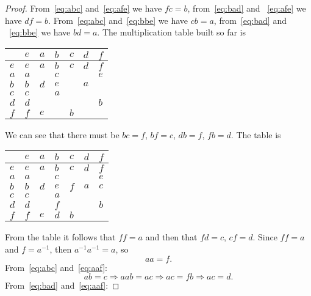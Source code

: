 \begin{proof}
  From~\eqref{eq:abc} and~\eqref{eq:afe} we have $fc = b$,
  from~\eqref{eq:bad} and ~\eqref{eq:afe} we have $df = b$.
  From~\eqref{eq:abc} and~\eqref{eq:bbe} we have $cb = a$,
  from~\eqref{eq:bad} and ~\eqref{eq:bbe} we have $bd = a$. The
  multiplication table built so far is
  \begin{center}
  \begin{tabular}{l|llllll}
        & $e$ & $a$ & $b$ & $c$ & $d$ & $f$ \\ \hline
    $e$ & $e$ & $a$ & $b$ & $c$ & $d$ & $f$ \\
    $a$ & $a$ & $ $ & $c$ & $ $ & $ $ & $e$ \\
    $b$ & $b$ & $d$ & $e$ & $ $ & $a$ & $ $ \\
    $c$ & $c$ & $ $ & $a$ & $ $ & $ $ & $ $ \\
    $d$ & $d$ & $ $ & $ $ & $ $ & $ $ & $b$ \\
    $f$ & $f$ & $e$ & $ $ & $b$ & $ $ & $ $ \\
  \end{tabular}
  \end{center}
  We can see that there must be $bc = f$, $bf = c$, $db = f$, $fb =
  d$. The table is
  \begin{center}
  \begin{tabular}{l|llllll}
        & $e$ & $a$ & $b$ & $c$ & $d$ & $f$ \\ \hline
    $e$ & $e$ & $a$ & $b$ & $c$ & $d$ & $f$ \\
    $a$ & $a$ & $ $ & $c$ & $ $ & $ $ & $e$ \\
    $b$ & $b$ & $d$ & $e$ & $f$ & $a$ & $c$ \\
    $c$ & $c$ & $ $ & $a$ & $ $ & $ $ & $ $ \\
    $d$ & $d$ & $ $ & $f$ & $ $ & $ $ & $b$ \\
    $f$ & $f$ & $e$ & $d$ & $b$ & $ $ & $ $ \\
  \end{tabular}
  \end{center}
  From the table it follows that $ff = a$ and then that $fd = c$, $cf
  = d$. Since $ff = a$ and $f = a^{-1}$, then $a^{-1}a^{-1} = a$, so
  \begin{equation}
    aa = f. \label{eq:aaf}
  \end{equation}
  From~\eqref{eq:abc} and~\eqref{eq:aaf}:
  \begin{equation} \nonumber
    ab = c \Rightarrow aab = ac \Rightarrow ac = fb \Rightarrow ac = d.
  \end{equation}
  From~\eqref{eq:bad} and~\eqref{eq:aaf}:

\end{proof}
